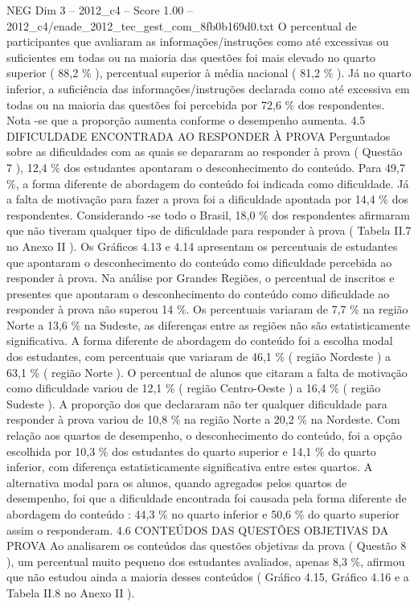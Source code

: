 \begin{textsample}{NEG Dim 3 – 2012\_c4 – Score 1.00 – 2012\_c4/enade\_2012\_tec\_gest\_com\_8fb0b169d0.txt}
O percentual de participantes que avaliaram as informações/instruções como até excessivas ou suficientes em todas ou na maioria das questões foi mais elevado no quarto superior ( 88,2 \% ), percentual superior à média nacional ( 81,2 \% ).
Já no quarto inferior, a suficiência das informações/instruções declarada como até excessiva em todas ou na maioria das questões foi percebida por 72,6 \% dos respondentes.
Nota -se que a proporção aumenta conforme o desempenho aumenta. 4.5 DIFICULDADE ENCONTRADA AO RESPONDER À PROVA Perguntados sobre as dificuldades com as quais se depararam ao responder à prova ( Questão 7 ), 12,4 \% dos estudantes apontaram o desconhecimento do conteúdo.
Para 49,7 \%, a forma diferente de abordagem do conteúdo foi indicada como dificuldade.
Já a falta de motivação para fazer a prova foi a dificuldade apontada por 14,4 \% dos respondentes.
Considerando -se todo o Brasil, 18,0 \% dos respondentes afirmaram que não tiveram qualquer tipo de dificuldade para responder à prova ( Tabela II.7 no Anexo II ).
Os Gráficos 4.13 e 4.14 apresentam os percentuais de estudantes que apontaram o desconhecimento do conteúdo como dificuldade percebida ao responder à prova.
Na análise por Grandes Regiões, o percentual de inscritos e presentes que apontaram o desconhecimento do conteúdo como dificuldade ao responder à prova não superou 14 \%.
Os percentuais variaram de 7,7 \% na região Norte a 13,6 \% na Sudeste, as diferenças entre as regiões não são estatisticamente significativa.
A forma diferente de abordagem do conteúdo foi a escolha modal dos estudantes, com percentuais que variaram de 46,1 \% ( região Nordeste ) a 63,1 \% ( região Norte ).
O percentual de alunos que citaram a falta de motivação como dificuldade variou de 12,1 \% ( região Centro-Oeste ) a 16,4 \% ( região Sudeste ).
A proporção dos que declararam não ter qualquer dificuldade para responder à prova variou de 10,8 \% na região Norte a 20,2 \% na Nordeste.
Com relação aos quartos de desempenho, o desconhecimento do conteúdo, foi a opção escolhida por 10,3 \% dos estudantes do quarto superior e 14,1 \% do quarto inferior, com diferença estatisticamente significativa entre estes quartos.
A alternativa modal para os alunos, quando agregados pelos quartos de desempenho, foi que a dificuldade encontrada foi causada pela forma diferente de abordagem do conteúdo : 44,3 \% no quarto inferior e 50,6 \% do quarto superior assim o responderam. 4.6 CONTEÚDOS DAS QUESTÕES OBJETIVAS DA PROVA Ao analisarem os conteúdos das questões objetivas da prova ( Questão 8 ), um percentual muito pequeno dos estudantes avaliados, apenas 8,3 \%, afirmou que não estudou ainda a maioria desses conteúdos ( Gráfico 4.15, Gráfico 4.16 e a Tabela II.8 no Anexo II ).

\end{textsample}
